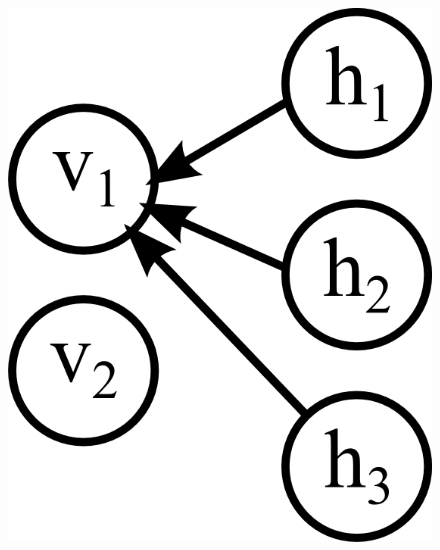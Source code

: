 \begin{figure}
{\begin{minipage}{0.33\textwidth}
	\includegraphics[scale=1]{images/rbm-step2.png}\end{minipage}}
\end{figure}
